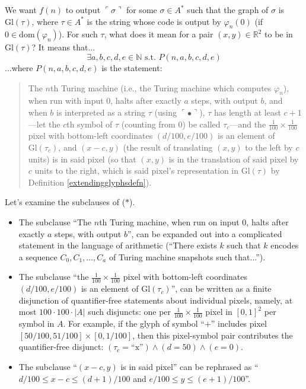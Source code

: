 \documentclass[table, svgnames, dvipsnames, letterpaper, 11pt]{report}
\theoremstyle{remark}
\begin{document}
We want $f(n)$ to output $\ulcorner\sigma\urcorner$ for some $\sigma\in A^*$
such that the graph of $\sigma$ is $\mathrm{Gl}(\tau)$,
where $\tau\in A^*$ is the string
whose code is output by $\varphi_n(0)$ (if $0\in \mathrm{dom}(\varphi_n)$).
For such $\tau$, what does
it mean for a pair $(x,y)\in\mathbb R^2$ to be in $\mathrm{Gl}(\tau)$?
It means that...
\begin{equation}
  \tag{*}
  \exists a,b,c,d,e \in\mathbb N
  \mbox{ s.t.\ } P(n,a,b,c,d,e)
\end{equation}
...where $P(n,a,b,c,d,e)$ is the statement:
\begin{quote}
  The $n$th Turing machine (i.e., the Turing machine which
  computes $\varphi_n$), when run with input $0$, halts after exactly
  $a$ steps, with output $b$, and when $b$ is interpreted as
  a string $\tau$ (using $\ulcorner\bullet\urcorner$), $\tau$ has length at
  least $c+1$---let the $c$th symbol of $\tau$ (counting from $0$) be
  called $\tau_{c}$---and the $\frac1{100}\times\frac1{100}$ pixel
  with bottom-left coordinates $(d/100,e/100)$ is an element of
  $\mathrm{Gl}(\tau_{c})$, and $(x-c,y)$ (the result of translating $(x,y)$
  to the left by $c$ units) is in said pixel (so that $(x,y)$ is in the
  translation of said pixel by $c$ units to the right, which is said pixel's
  representation in $\mathrm{Gl}(\tau)$ by Definition \ref{extendingglyphsdefn}).
\end{quote}

Let's examine the subclauses of ($*$).
\begin{itemize}
  \item
  The subclause ``The $n$th Turing machine, when run
  on input $0$, halts after exactly $a$ steps, with output $b$'', can be
  expanded out into a complicated statement in the language of arithmetic
  (``There exists $k$ such that $k$ encodes a sequence $C_0,C_1,\ldots,C_a$
  of Turing machine snapshots such that...'').
  \item
  The subclause
  ``the $\frac1{100}\times\frac1{100}$ pixel
  with bottom-left coordinates $(d/100,e/100)$ is an element of
  $\mathrm{Gl}(\tau_{c})$'', can be written as a finite disjunction
  of quantifier-free statements about individual pixels, namely,
  at most $100\cdot 100\cdot |A|$ such disjuncts: one per
  $\frac1{100}\times\frac1{100}$ pixel in $[0,1]^2$ per
  symbol in $A$. For example, if the glyph of symbol ``$+$'' includes
  pixel $[50/100,51/100]\times [0,1/100]$, then this pixel-symbol pair
  contributes the
  quantifier-free disjunct:
  $(\tau_{c}=\mbox{``x''})\wedge (d=50)\wedge (e=0)$.
  \item
  The subclause ``$(x-c,y)$ is in said pixel'' can be
  rephrased as ``$d/100\leq x-c\leq (d+1)/100$ and
  $e/100\leq y\leq (e+1)/100$''.
\end{itemize}
\end{document}

